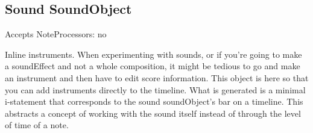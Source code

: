 \subsection{Sound SoundObject}\label{sound}

Accepts NoteProcessors: no

Inline instruments. When experimenting with sounds, or if you're going
to make a soundEffect and not a whole composition, it might be tedious
to go and make an instrument and then have to edit score information.
This object is here so that you can add instruments directly to the
timeline. What is generated is a minimal i-statement that corresponds to
the sound soundObject's bar on a timeline. This abstracts a concept of
working with the sound itself instead of through the level of time of a
note.
